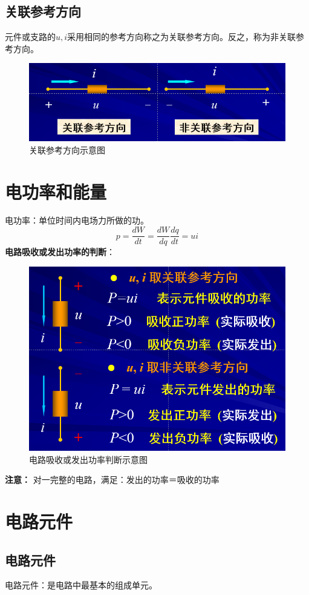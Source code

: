\documentclass[11pt,a4paper,oneside]{book}
\begin{document}
\subsection{关联参考方向}
元件或支路的$u,i$采用相同的参考方向称之为关联参考方向。反之，称为非关联参考方向。
\begin{figure}[H]
	\centering
	\includegraphics[width=0.7\linewidth]{screenshot109}
	\caption{关联参考方向示意图}
	\label{fig:screenshot109}
\end{figure}

\section{电功率和能量}
电功率：单位时间内电场力所做的功。
\begin{equation}
	p=\frac{dW}{dt}=\frac{dW}{dq} \frac{dq}{dt}=ui
\end{equation}
\textbf{电路吸收或发出功率的判断}：
\begin{figure}[H]
	\centering
	\includegraphics[width=0.7\linewidth]{screenshot110}
	\caption{电路吸收或发出功率判断示意图}
	\label{fig:screenshot110}
\end{figure}
\textbf{注意：}
对一完整的电路，满足：发出的功率＝吸收的功率
\section{电路元件}
\subsection{电路元件}
电路元件：是电路中最基本的组成单元。
\end{document}
